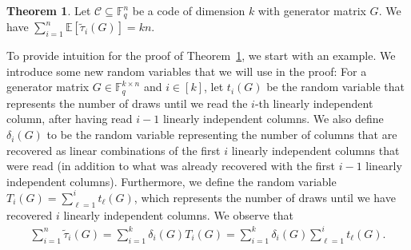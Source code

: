 \documentclass[11pt,a4paper,reqno,twoside]{amsart}
\theoremstyle{definition}
\newtheorem{theorem}{Theorem}
\newcommand{\F}{\mathbb{F}}
\newcommand{\E}{\mathbb{E}}
\newcommand{\mC}{\mathcal{C}}
\begin{document}
\begin{theorem} \label{thm:sumra}
Let $\mC \subseteq \F_q^n$ be a code of dimension $k$ with generator matrix $G$. We have 
$\sum_{i=1}^n\E\left[ \widetilde{\tau}_i(G)\right] = kn.$
\end{theorem}
To provide intuition for the proof of Theorem~\ref{thm:sumra}, we start with an example. We introduce some new random variables that we will use in the proof: For a generator matrix $ G \in \mathbb{F}_q^{k \times n} $ and $ i \in [k] $, let $ t_i(G) $ be the random variable that represents the number of draws until we read the $ i $-th linearly independent column, after having read $ i-1 $ linearly independent columns. We also define $ \delta_i(G) $ to be the random variable representing the number of columns that are recovered as linear combinations of the first $ i $ linearly independent columns that were read (in addition to what was already recovered with the first $ i-1 $ linearly independent columns). Furthermore, we define the random variable $ T_i(G) = \sum_{\ell=1}^i t_{\ell}(G) $, which represents the number of draws until we have recovered $ i $ linearly independent columns. We observe that
\begin{align} \label{eq:rewrite}
    \sum_{i=1}^n \widetilde{\tau}_i(G) = \sum_{i=1}^k \delta_i(G) T_i(G) = \sum_{i=1}^k \delta_i(G) \sum_{\ell=1}^i t_\ell(G).
\end{align}
\end{document}
